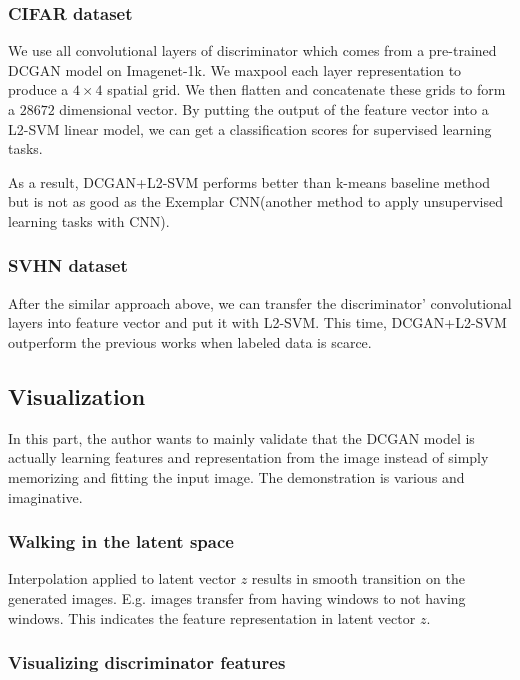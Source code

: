 \documentclass{article} %
\begin{document}
\subsubsection{CIFAR dataset}

We use all convolutional layers of discriminator which comes from a pre-trained DCGAN model on Imagenet-1k. We maxpool each layer representation to produce a $4 \times 4$ spatial grid. We then flatten and concatenate these grids to form a $28672$ dimensional vector. By putting the output of the feature vector into a L2-SVM linear model, we can get a classification scores for supervised learning tasks.

As a result, DCGAN+L2-SVM performs better than k-means baseline method but is not as good as the Exemplar CNN(another method to apply unsupervised learning tasks with CNN).

\subsubsection{SVHN dataset}

After the similar approach above, we can transfer the discriminator' convolutional layers into feature vector and put it with L2-SVM. This time, DCGAN+L2-SVM outperform the previous works when labeled data is scarce.

\subsection{Visualization}

In this part, the author wants to mainly validate that the DCGAN model is actually learning features and representation from the image instead of simply memorizing and fitting the input image. The demonstration is various and imaginative.

\subsubsection{Walking in the latent space}

Interpolation applied to latent vector $z$ results in smooth transition on the generated images. E.g. images transfer from having windows to not having windows. This indicates the feature representation in latent vector $z$.

\subsubsection{Visualizing discriminator features}
\end{document}
